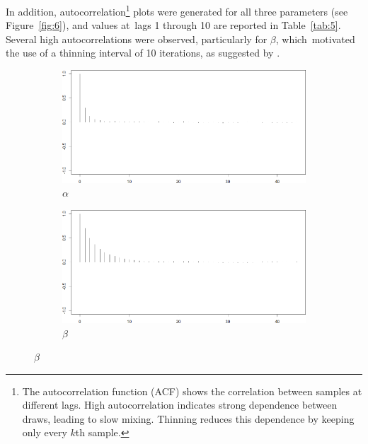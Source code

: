 \documentclass{Class/julia}
\begin{document}
In addition, autocorrelation\footnote{The autocorrelation function (ACF) shows the correlation between samples at different lags. High autocorrelation indicates strong dependence between draws, leading to slow mixing. Thinning reduces this dependence by keeping only every \( k \)th sample.} plots were generated for all three parameters (see Figure~\ref{fig:6}), and values at~lags 1 through 10 are reported in Table~\ref{tab:5}. Several high autocorrelations were observed, particularly for \( \beta \), which~motivated the use of a thinning interval of 10 iterations, as suggested by \citet{dudley2006bayesian}.

\begin{figure}[!ht]
    \centering
    \caption{Autocorrelation Plots}
    \label{fig:6}
    \begin{subfigure}{0.45\textwidth}
        \centering
        \includegraphics[width=\textwidth]{rytgaard1990/acf_alpha.png}
        \caption{\( \alpha \)}
    \end{subfigure}
    \hfill
    \begin{subfigure}{0.45\textwidth}
        \centering
        \includegraphics[width=\textwidth]{rytgaard1990/acf_beta.png}
        \caption{\( \beta \)}
    \end{subfigure}

    \vspace{1em}


\end{figure}
\end{document}
